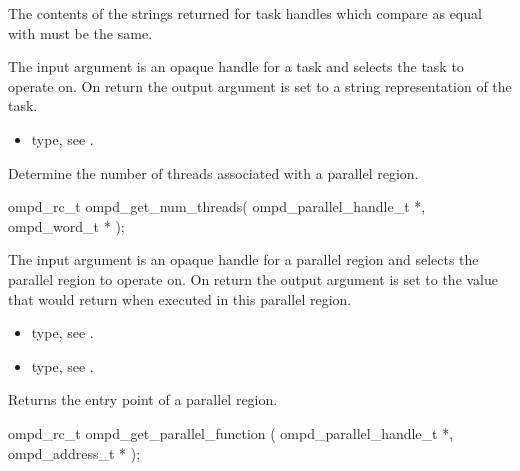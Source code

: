 The contents of the strings returned for task handles which compare as equal with
 must be the same.

\argdesc
The input argument  is an opaque handle for a task and selects the task to operate on.
On return the output argument  is set to a string representation of the task.

\crossreferences
\begin{itemize}
	\item {} type, see .
\end{itemize}



\label{ompd:ompd_get_num_threads}
\summary
Determine the number of threads associated with a parallel region.

\format
\begin{cspecific}
\begin{ompSyntax}
ompd_rc_t ompd_get_num_threads(
  ompd_parallel_handle_t *,
  ompd_word_t *
);
\end{ompSyntax}
\end{cspecific}

\descr

\argdesc
The input argument  is an opaque handle for a parallel region and selects the parallel region to operate on.
On return the output argument  is set to the value that  would return when
executed in this parallel region.

\crossreferences
\begin{itemize}
	\item {} type, see .
	\item {} type, see .
\end{itemize}

\label{ompd:ompd_get_parallel_function}
\summary
Returns the entry point of a parallel region.

\format
\begin{cspecific}
\begin{ompSyntax}
ompd_rc_t ompd_get_parallel_function (
  ompd_parallel_handle_t *,
  ompd_address_t *
);
\end{ompSyntax}
\end{cspecific}


